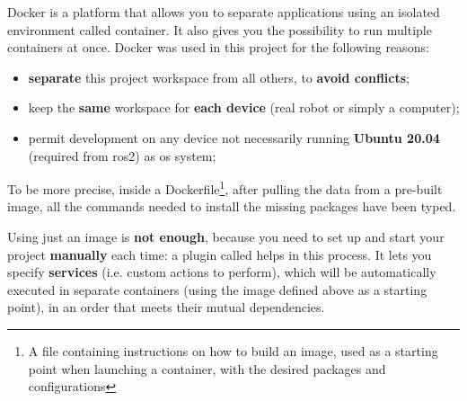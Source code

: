 Docker is a platform that allows you to separate applications using an isolated environment called container. It also gives you the possibility to run multiple containers at once. Docker was used in this project for the following reasons:
  
\begin{itemize}
    \item \textbf{separate} this project workspace from all others, to \textbf{avoid conflicts};
    \item keep the \textbf{same} workspace for \textbf{each device} (real robot or simply a computer);
    \item permit development on any device not necessarily running \textbf{Ubuntu 20.04} (required from \acrshort{ros}2) as \acrshort{os} system;
\end{itemize}

To be more precise, inside a Dockerfile\footnote{A file containing instructions on how to build an image, used as a starting point when launching a container, with the desired packages and configurations}, after pulling the data from a pre-built image\cite{dockerimage}, all the commands needed to install the missing packages have been typed.

Using just an image is \textbf{not enough}, because you need to set up and start your project \textbf{manually} each time: a plugin called  helps in this process. It lets you specify \textbf{services} (i.e. custom actions to perform), which  will be automatically executed in separate containers (using the image defined above as a starting point), in an order that meets their mutual dependencies.